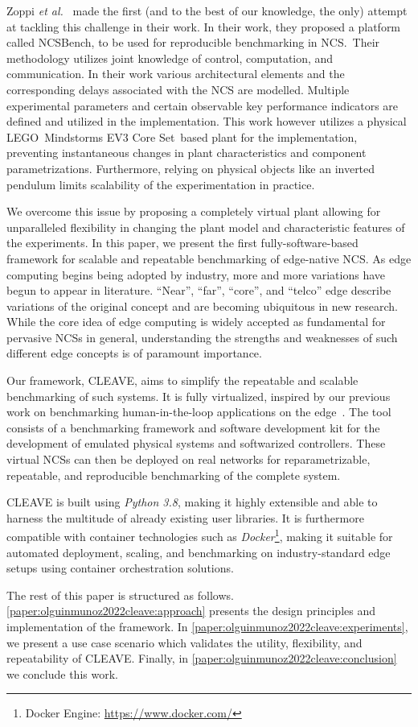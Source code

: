 Zoppi \emph{et al.}~\cite{zoppi2020ncsbench} made the first (and to the best of our knowledge, the only) attempt at tackling this challenge in their work.
In their work, they proposed a platform called NCSBench, to be used for reproducible benchmarking in NCS.\ 
Their methodology utilizes joint knowledge of control, computation, and communication. 
In their work various architectural elements and the corresponding delays associated with the NCS are modelled. 
Multiple experimental parameters and certain observable key performance indicators are defined and utilized in the implementation. 
This work however utilizes a physical LEGO\textregistered{}\ Mindstorms EV3 Core Set\texttrademark{}\  based plant for the implementation, preventing instantaneous changes in plant characteristics and component parametrizations.
Furthermore, relying on physical objects like an inverted pendulum limits scalability of the experimentation in practice. 

We overcome this issue by proposing a completely virtual plant allowing for unparalleled flexibility in changing the plant model and characteristic features of the experiments.
In this paper, we present the first fully-software-based framework for scalable and repeatable benchmarking of edge-native \gls{NCS}.
As edge computing begins being adopted by industry, more and more variations have begun to appear in literature.
``Near'', ``far'', ``core'', and ``telco'' edge describe variations of the original concept and are becoming ubiquitous in new research.
While the core idea of edge computing is widely accepted as fundamental for pervasive \glspl{NCS} in general, understanding the strengths and weaknesses of such different edge concepts is of paramount importance.

Our framework, \gls{CLEAVE}, aims to simplify the repeatable and scalable benchmarking of such systems.
It is fully virtualized, inspired by our previous work on benchmarking human-in-the-loop applications on the edge~\cite{olguinmunoz2019edgedroid}.
The tool consists of a benchmarking framework and software development kit for the development of emulated physical systems and softwarized controllers.
These virtual \glspl{NCS} can then be deployed on real networks for reparametrizable, repeatable, and reproducible benchmarking of the complete system.

\gls{CLEAVE} is built using \emph{Python 3.8}, making it highly extensible and able to harness the multitude of already existing user libraries.
It is furthermore compatible with container technologies such as \emph{Docker}\footnote{Docker Engine: \url{https://www.docker.com/}}, making it suitable for automated deployment, scaling, and benchmarking on industry-standard edge setups using container orchestration solutions.

The rest of this paper is structured as follows.
\cref{paper:olguinmunoz2022cleave:approach} presents the design principles and implementation of the framework.
In \cref{paper:olguinmunoz2022cleave:experiments}, we present a use case scenario which validates the utility, flexibility, and repeatability of \gls{CLEAVE}.
Finally, in \cref{paper:olguinmunoz2022cleave:conclusion} we conclude this work.

